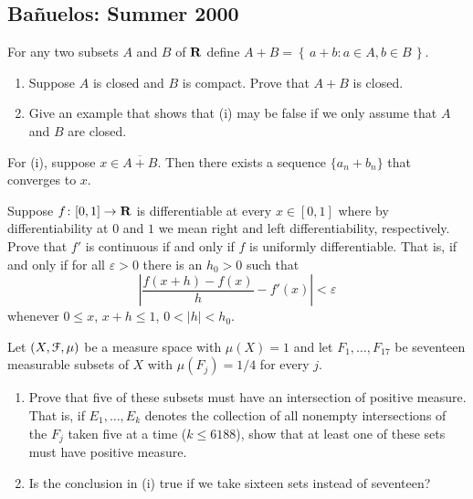 \subsection{Bañuelos: Summer 2000}
\setcounter{exercise}{0}
\setcounter{equation}{0}

\begin{problem}
  For any two subsets $A$ and $B$ of $\mathbf{R}$ define $A+B=\left\{\,a+b:a\in
    A,b\in B\,\right\}$.
  \begin{enumerate}[label=(\roman*),noitemsep]
  \item Suppose $A$ is closed and $B$ is compact. Prove that $A+B$ is
    closed.
  \item Give an example that shows that (i) may be false if we only assume
    that $A$ and $B$ are closed.
  \end{enumerate}
\end{problem}
\begin{solution}
  For (i), suppose $x\in\overline{A+B}$. Then there exists a sequence
  $\{a_n+b_n\}$ that converges to $x$.
\end{solution}

\begin{problem}
  Suppose $f\colon[0,1]\to\mathbf{R}$ is differentiable at every $x\in[0,1]$
  where by differentiability at $0$ and $1$ we mean right and left
  differentiability, respectively. Prove that $f'$ is continuous if and
  only if $f$ is uniformly differentiable. That is, if and only if for all
  $\varepsilon>0$ there is an $h_0>0$ such that
  \[
    \left|\frac{f(x+h)-f(x)}{h}-f'(x)\right|<\varepsilon
  \]
  whenever $0\leq x$, $x+h\leq 1$, $0<|h|<h_0$.
\end{problem}
\begin{solution}
\end{solution}

\begin{problem}
  Let $(X,\mathcal{F},\mu)$ be a measure space with $\mu(X)=1$ and let
  $F_1,\ldots,F_{17}$ be seventeen measurable subsets of $X$ with
  $\mu(F_j)=1/4$ for every $j$.
  \begin{enumerate}[label=(\roman*),noitemsep]
  \item Prove that five of these subsets must have an intersection of
    positive measure. That is, if $E_1,\ldots,E_k$ denotes the collection
    of all nonempty intersections of the $F_j$ taken five at a time ($k\leq
    6188$), show that at least one of these sets must have positive
    measure.
  \item Is the conclusion in (i) true if we take sixteen sets instead of
    seventeen?
  \end{enumerate}
\end{problem}
\begin{solution}
\end{solution}

